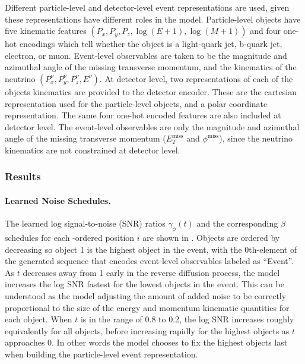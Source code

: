 Different particle-level and detector-level event representations are used, given these representations have different roles in the model.
Particle-level objects have five kinematic features $(P_x, P_y, P_z, \log(E+1), \log(M+1))$ and four one-hot encodings which tell whether the object is a light-quark jet, b-quark jet, electron, or muon.
Event-level observables are taken to be the magnitude and azimuthal angle of the missing transverse momentum, and the kinematics of the neutrino $(P_x^\nu, P_y^\nu, P_z^\nu, E^\nu)$.
At detector level, two representations of each of the objects kinematics are provided to the detector encoder.
These are the cartesian representation used for the particle-level objects, and a polar coordinate representation.
The same four one-hot encoded features are also included at detector level.
The event-level observables are only the magnitude and azimuthal angle of the missing transverse momentum ($E_T^\text{miss}$ and $\phi^\text{miss}$), since the neutrino kinematics are not constrained at detector level.

\subsubsection{Results}

\paragraph{Learned Noise Schedules.}

The learned log signal-to-noise (SNR) ratios $\gamma_\phi(t)$ and the corresponding $\beta$ schedules for each \pt-ordered position $i$ are shown in .
Objects are ordered by decreasing \pt so object 1 is the highest \pt object in the event, with the 0th-element of the generated sequence that encodes event-level observables labeled as ``Event''.
As $t$ decreases away from 1 early in the reverse diffusion process, the model increases the log SNR fastest for the lowest \pt objects in the event.
This can be understood as the model adjusting the amount of added noise to be correctly proportional to the size of the energy and momentum kinematic quantities for each object.
When $t$ is in the range of 0.8 to 0.2, the log SNR increases roughly equivalently for all objects, before increasing rapidly for the highest \pt objects as $t$ approaches 0.
In other words the model chooses to fix the highest \pt objects last when building the particle-level event representation.

